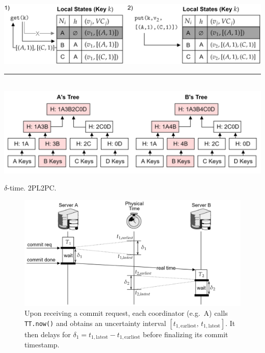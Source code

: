 \begin{multicols}{2}
\hspace{-1.5em}
\includegraphics[width=\linewidth]{Sections/dyn/vc_3.png}\\

\vspace{.5em}
\noindent
\rule{\linewidth}{0.4pt}\\

\hspace{-1.5em}
\includegraphics[width=\linewidth]{Sections/dyn/merkle.png}\\
\end{multicols}

\newpage

\noindent
$\delta$-time. 2PL2PC.



\begin{figure}[ht!]

    \centering
    \includegraphics[width=\textwidth]{Sections/span/tt_2.png}
    \caption{Upon receiving a commit request, each coordinator (e.g.\ A) calls \texttt{TT.now()} and obtains an uncertainty interval \([t_{1,\mathrm{earliest}},\,t_{1,\mathrm{latest}}]\). It then delays for \(\delta_1 = t_{1,\mathrm{latest}} - t_{1,\mathrm{earliest}}\) before finalizing its commit timestamp.}
\end{figure}


